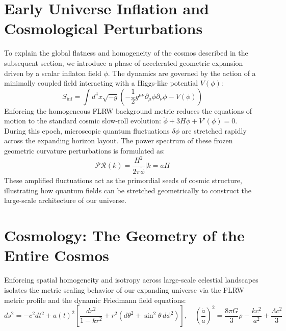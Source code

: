\documentclass[11pt,a4paper]{article}
\begin{document}
\section{Early Universe Inflation and Cosmological Perturbations}
To explain the global flatness and homogeneity of the cosmos described in the subsequent section, we introduce a phase of accelerated geometric expansion driven by a scalar inflaton field $\phi$. The dynamics are governed by the action of a minimally coupled field interacting with a Higgs-like potential $V(\phi)$:
\begin{equation}
S_{\text{inf}} = \int d^4x \sqrt{-g} \left( -\frac{1}{2} g^{\mu\nu} \partial_\mu \phi \partial_\nu \phi - V(\phi) \right)
\end{equation}
Enforcing the homogeneous FLRW background metric reduces the equations of motion to the standard cosmic slow-roll evolution: $\ddot{\phi} + 3H\dot{\phi} + V'(\phi) = 0$. During this epoch, microscopic quantum fluctuations $\delta\phi$ are stretched rapidly across the expanding horizon layout. The power spectrum of these frozen geometric curvature perturbations is formulated as:
\begin{equation}
\mathcal{P}{\mathcal{R}}(k) = \frac{H^2}{2\pi \dot{\phi}} \biggr\vert{k=aH}
\end{equation}
These amplified fluctuations act as the primordial seeds of cosmic structure, illustrating how quantum fields can be stretched geometrically to construct the large-scale architecture of our universe.
\section{Cosmology: The Geometry of the Entire Cosmos}
Enforcing spatial homogeneity and isotropy across large-scale celestial landscapes isolates the metric scaling behavior of our expanding universe via the FLRW metric profile and the dynamic Friedmann field equations:
\begin{equation}
ds^2 = -c^2dt^2 + a(t)^2 \left[ \frac{dr^2}{1 - kr^2} + r^2(d\theta^2 + \sin^2\theta \, d\phi^2) \right], \quad \left(\frac{\dot{a}}{a}\right)^2 = \frac{8\pi G}{3}\rho - \frac{kc^2}{a^2} + \frac{\Lambda c^2}{3}
\end{equation}
\newpage
{}
\nocite{*}
\printbibliography
\end{document}
